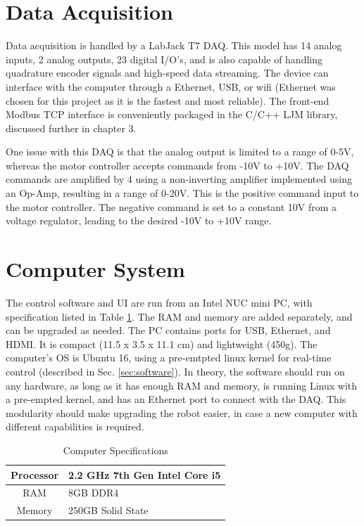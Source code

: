 \documentclass[12pt]{report}
\begin{document}
	
	\section{Data Acquisition} 

	Data acquisition is handled by a LabJack T7 DAQ. This model has 14 analog inputs, 2 analog outputs, 23 digital I/O's, and is also capable of handling quadrature encoder signals and high-speed data streaming. The device can interface with the computer through a Ethernet, USB, or wifi (Ethernet was chosen for this project as it is the fastest and most reliable). The front-end Modbus TCP interface is conveniently packaged in the C/C++ LJM library, discussed further in chapter 3.
	
	One issue with this DAQ is that the analog output is limited to a range of 0-5V, whereas the motor controller accepts commands from -10V to +10V. The DAQ commands are amplified by 4 using a non-inverting amplifier implemented using an Op-Amp, resulting in a range of 0-20V. This is the positive command input to the motor controller. The negative command is set to a constant 10V from a voltage regulator, leading to the desired -10V to +10V range. 
	


	\section{Computer System}

	The control software and UI are run from an Intel NUC mini PC, with specification listed in Table \ref{tab:comp}. The RAM and memory are added separately, and can be upgraded as needed. The PC contains ports for USB, Ethernet, and HDMI. It is compact (11.5 x 3.5 x 11.1 cm) and lightweight (450g). The computer's OS is Ubuntu 16, using a pre-emtpted linux kernel for real-time control (described in Sec. \ref{sec:software}). In theory, the software should run on any hardware, as long as it has enough RAM and memory, is running Linux with a pre-empted kernel, and has an Ethernet port to connect with the DAQ. This modularity should make upgrading the robot easier, in case a new computer with different capabilities is required. 
	
	
	\begin{table}[h]
	\centering
	\caption{Computer Specifications}	
	\begin{tabular}{|c|l|}
		\hline
		Processor & 2.2 GHz 7th Gen Intel Core i5 \\ \hline
		RAM & 8GB DDR4 \\ \hline
		Memory & 250GB Solid State \\ \hline
		\end{tabular}
	\label{tab:comp}
	\end{table}
	
\end{document}
